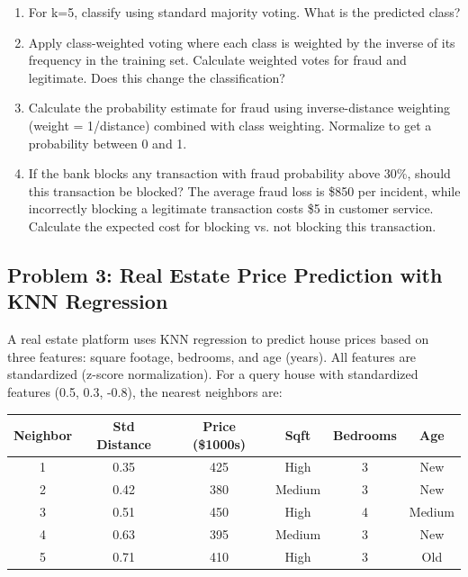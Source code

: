 \documentclass[12pt]{article}
\begin{document}
\begin{enumerate}[label=(\alph*)]
\item For k=5, classify using standard majority voting. What is the predicted class?

\item Apply class-weighted voting where each class is weighted by the inverse of its frequency in the training set. Calculate weighted votes for fraud and legitimate. Does this change the classification?

\item Calculate the probability estimate for fraud using inverse-distance weighting (weight = 1/distance) combined with class weighting. Normalize to get a probability between 0 and 1.

\item If the bank blocks any transaction with fraud probability above 30\%, should this transaction be blocked? The average fraud loss is \$850 per incident, while incorrectly blocking a legitimate transaction costs \$5 in customer service. Calculate the expected cost for blocking vs. not blocking this transaction.
\end{enumerate}

\subsection*{Problem 3: Real Estate Price Prediction with KNN Regression}

A real estate platform uses KNN regression to predict house prices based on three features: square footage, bedrooms, and age (years). All features are standardized (z-score normalization). For a query house with standardized features (0.5, 0.3, -0.8), the nearest neighbors are:

\begin{center}
\begin{tabular}{cccccc}
\toprule
Neighbor & Std Distance & Price (\$1000s) & Sqft & Bedrooms & Age \\
\midrule
1 & 0.35 & 425 & High & 3 & New \\
2 & 0.42 & 380 & Medium & 3 & New \\
3 & 0.51 & 450 & High & 4 & Medium \\
4 & 0.63 & 395 & Medium & 3 & New \\
5 & 0.71 & 410 & High & 3 & Old \\
\bottomrule
\end{tabular}
\end{center}
\end{document}
